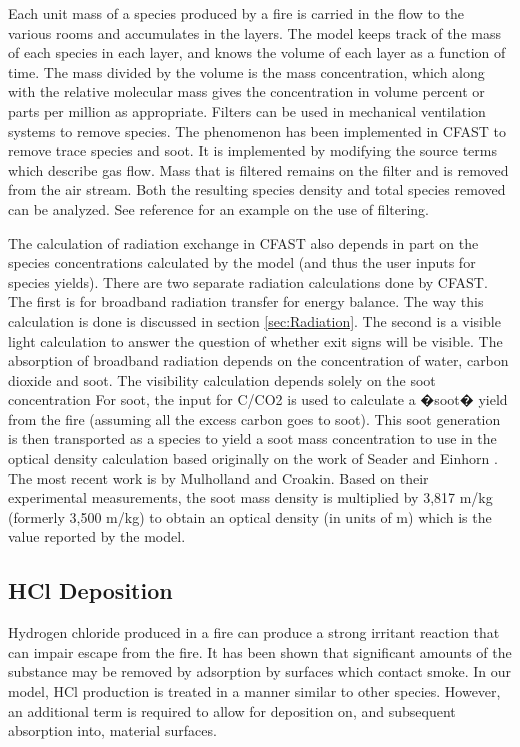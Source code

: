 Each unit mass of a species produced by a fire is carried in the flow to the various rooms and accumulates in the layers.  The model keeps track of the mass of each species in each layer, and knows the volume of each layer as a function of time.  The mass divided by the volume is the mass concentration, which along with the relative molecular mass gives the concentration in volume percent or parts per million as appropriate. Filters can be used in mechanical ventilation systems to remove species. The phenomenon has been implemented in CFAST to remove trace species and soot. It is implemented by modifying the source terms which describe gas flow. Mass that is filtered remains on the filter and is removed from the air stream. Both the resulting species density and total species removed can be analyzed. See reference \cite{Jones:2008} for an example on the use of filtering.

The calculation of radiation exchange in CFAST also depends in part on the species concentrations calculated by the model (and thus the user inputs for species yields). There are two separate radiation calculations done by CFAST. The first is for broadband radiation transfer for energy balance. The way this calculation is done is discussed in section \ref{sec:Radiation}. The second is a visible light calculation to answer the question of whether exit signs will be visible. The absorption of broadband radiation depends on the concentration of water, carbon dioxide and soot. The visibility calculation depends solely on the soot concentration For soot, the input for C/CO2 is used to calculate a �soot� yield from the fire (assuming all the excess carbon goes to soot). This soot generation is then transported as a species to yield a soot mass concentration to use in the optical density calculation based originally on the work of Seader and Einhorn \cite{Seader:1976}. The most recent work is by Mulholland and Croakin\cite{Mullholland:2000}. Based on their experimental measurements, the soot mass density is multiplied by 3,817 m/kg (formerly 3,500 m/kg) to obtain an optical density (in units of m) which is the value reported by the model.

\subsection{HCl Deposition}\label{HClDeposition}

Hydrogen chloride produced in a fire can produce a strong irritant reaction that can impair escape from the fire.  It has been shown \cite{Galloway:1989} that significant amounts of the substance may be removed by adsorption by surfaces which contact smoke.  In our model, HCl production is treated in a manner similar to other species.  However, an additional term is required to allow for deposition on, and subsequent absorption into, material surfaces.

